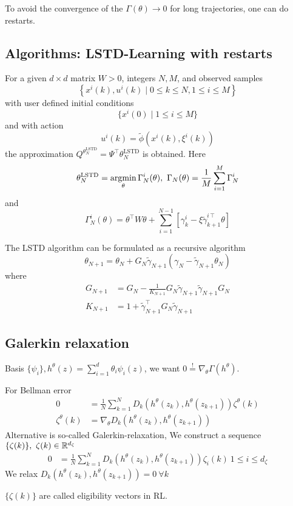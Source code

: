 To avoid the convergence of the \(\Gamma(\theta)\to 0\) for long trajectories,
one can do restarts.

\subsection{Algorithms: LSTD-Learning with restarts}
For a given \(d\times d\) matrix \(W>0\), integers \(N,M\), and 
observed samples \[\left\{x^i(k),u^i(k)\mid 0\leq k\leq N,1\leq i\leq M\right\}\]
with user defined initial conditions \[\{x^i(0)\mid 1\leq i\leq M\}\]
and with action  \[u^i(k)=\tilde{\phi}(x^i(k),\xi^i(k))\]
the approximation \(Q^{\theta_N^{\text{LSTD}}}=\Psi^\intercal\theta_N^{\text{LSTD}}\)
is obtained. Here 
\[\theta_N^\text{LSTD}=\argmin_\theta \Gamma_N^i(\theta),\ \Gamma_N(\theta)=\frac{1}{M}\sum_{i=1}^M\Gamma_N^i\]
and 
\[\Gamma_N^i(\theta)=\theta^\intercal W \theta +\sum_{i=1}^{N-1}\left[\gamma_k^i-\xi\tilde{\gamma}_{k+1}^{i\intercal} \theta\right]\] %

\begin{remark} %
    The LSTD algorithm can be formulated as a recursive algorithm 
    \[\theta_{N+1}=\theta_N+G_N\tilde{\gamma}_{N+1}(\gamma_N-\tilde{\gamma}_{N+1}\theta_N)\]
    where \begin{align*}
        G_{N+1}&=G_N-\frac{1}{K_{N+1}}G_N\tilde{\gamma}_{N+1}\tilde{\gamma}_{N+1}G_N\\
        K_{N+1}&=1+\tilde{\gamma}_{N+1}^\intercal G_N \tilde{\gamma}_{N+1}
    \end{align*}
\end{remark}

\subsection{Galerkin relaxation}

Basis \(\{\psi_i\},h^\theta(z)=\sum_{i=1}^d \theta_i\psi_i(z)\), we want \(0\stackrel{!}{=}\nabla_\theta \Gamma(h^\theta)\).

For Bellman error 
\begin{align*}
    0&=\frac{1}{N}\sum_{k=1}^ND_k(h^\theta(z_k),h^\theta(z_{k+1}))\zeta^\theta(k)\\
    \zeta^\theta(k)&=\nabla_\theta D_k(h^\theta(z_k),h^\theta(z_{k+1}))
\end{align*}
Alternative is so-called Galerkin-relaxation, We construct a sequence \(\{\zeta(k)\},\ \zeta(k)\in \mathbb{R}^{d_\zeta}\)
\begin{align*}
    0&=\frac{1}{N}\sum_{k=1}^ND_{k}(h^\theta(z_k),h^\theta(z_{k+1}))\zeta_i(k)\ 1\leq i\leq d_\zeta
\end{align*}
We relax \(D_k(h^{\theta}(z_k),h^\theta(z_{k+1}))=0\ \forall k\)
\begin{center}
    \(\{\zeta(k)\}\) are called eligibility vectors in RL. 
\end{center}

